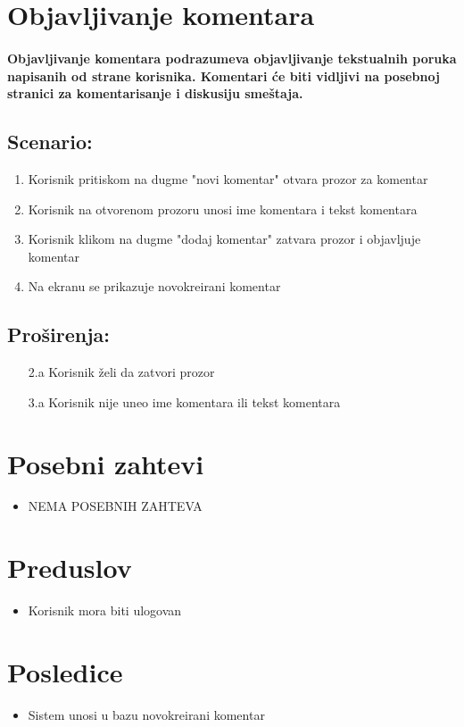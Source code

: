 \section{Objavljivanje komentara}
\paragraph{Objavljivanje komentara podrazumeva objavljivanje tekstualnih poruka napisanih od strane korisnika. Komentari će biti vidljivi na posebnoj stranici za komentarisanje i
diskusiju smeštaja.
}

\subsection{\textbf{Scenario:}}
\begin{enumerate}
    \item Korisnik pritiskom na dugme "novi komentar" otvara prozor za komentar
    \item Korisnik na otvorenom prozoru unosi ime komentara i tekst komentara
    \item Korisnik klikom na dugme "dodaj komentar" zatvara prozor i objavljuje komentar
    \item Na ekranu se prikazuje novokreirani komentar
\end{enumerate}
\newpage
\subsection{\textbf{Proširenja:}}

\begin{enumerate}
\color{Maroon}
  \item[2.a] Korisnik želi da zatvori prozor
  \item[3.a] Korisnik nije uneo ime komentara ili tekst komentara
\end{enumerate}
\section{Posebni zahtevi}
\begin{itemize}
    \item \color{Maroon}NEMA POSEBNIH ZAHTEVA
\end{itemize}
\section{Preduslov}
\begin{itemize}
    \item Korisnik mora biti ulogovan
\end{itemize}

\section{Posledice}
\begin{itemize}
    \item Sistem unosi u bazu novokreirani komentar
\end{itemize}
